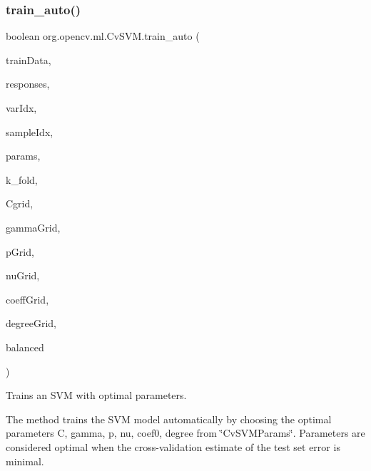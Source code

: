 \subsubsection{\texorpdfstring{train\+\_\+auto()}{train\_auto()}\hspace{0.1cm}{\footnotesize\ttfamily [1/2]}}
{\footnotesize\ttfamily boolean org.\+opencv.\+ml.\+Cv\+S\+V\+M.\+train\+\_\+auto (\begin{DoxyParamCaption}\item[{\mbox{\hyperlink{classorg_1_1opencv_1_1core_1_1_mat}{Mat}}}]{train\+Data,  }\item[{\mbox{\hyperlink{classorg_1_1opencv_1_1core_1_1_mat}{Mat}}}]{responses,  }\item[{\mbox{\hyperlink{classorg_1_1opencv_1_1core_1_1_mat}{Mat}}}]{var\+Idx,  }\item[{\mbox{\hyperlink{classorg_1_1opencv_1_1core_1_1_mat}{Mat}}}]{sample\+Idx,  }\item[{\mbox{\hyperlink{classorg_1_1opencv_1_1ml_1_1_cv_s_v_m_params}{Cv\+S\+V\+M\+Params}}}]{params,  }\item[{int}]{k\+\_\+fold,  }\item[{\mbox{\hyperlink{classorg_1_1opencv_1_1ml_1_1_cv_param_grid}{Cv\+Param\+Grid}}}]{Cgrid,  }\item[{\mbox{\hyperlink{classorg_1_1opencv_1_1ml_1_1_cv_param_grid}{Cv\+Param\+Grid}}}]{gamma\+Grid,  }\item[{\mbox{\hyperlink{classorg_1_1opencv_1_1ml_1_1_cv_param_grid}{Cv\+Param\+Grid}}}]{p\+Grid,  }\item[{\mbox{\hyperlink{classorg_1_1opencv_1_1ml_1_1_cv_param_grid}{Cv\+Param\+Grid}}}]{nu\+Grid,  }\item[{\mbox{\hyperlink{classorg_1_1opencv_1_1ml_1_1_cv_param_grid}{Cv\+Param\+Grid}}}]{coeff\+Grid,  }\item[{\mbox{\hyperlink{classorg_1_1opencv_1_1ml_1_1_cv_param_grid}{Cv\+Param\+Grid}}}]{degree\+Grid,  }\item[{boolean}]{balanced }\end{DoxyParamCaption})}

Trains an S\+VM with optimal parameters.

The method trains the S\+VM model automatically by choosing the optimal parameters {\ttfamily C}, {\ttfamily gamma}, {\ttfamily p}, {\ttfamily nu}, {\ttfamily coef0}, {\ttfamily degree} from \char`\"{}\+Cv\+S\+V\+M\+Params\char`\"{}. Parameters are considered optimal when the cross-\/validation estimate of the test set error is minimal.

